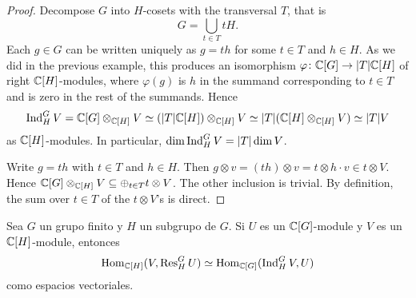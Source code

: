 \begin{proof}
Decompose $G$ into $H$-cosets with the transversal 
$T$, that is 
\[
G=\bigcup_{t\in T}tH.
\]
Each $g\in G$ can be written uniquely as $g=th$ for some $t\in T$ and $h\in H$. As we did in the previous example, this 
produces an isomorphism 
$\varphi\colon \mathbb{C}[G]\to |T|\mathbb{C}[H]$ of right $\mathbb{C}[H]$-modules, where $\varphi(g)$ is $h$ in the summand corresponding to $t\in T$
and is zero in the rest of the summands. Hence 
\[
\operatorname{Ind}_H^GV=\mathbb{C}[G]\otimes_{\mathbb{C}[H]}V\simeq (|T|\mathbb{C}[H])\otimes_{\mathbb{C}[H]}V\simeq |T|(\mathbb{C}[H]\otimes_{\mathbb{C}[H]}V)\simeq |T|V
\]
as $\mathbb{C}[H]$-modules. In particular, $\dim\operatorname{Ind}_H^GV=|T|\dim V$. 

 Write $g=th$ with $t\in T$ and $h\in H$. Then $g\otimes v=(th)\otimes v=t\otimes h\cdot v\in t\otimes V$. 
Hence $\mathbb{C}[G]\otimes_{\mathbb{C}[H]}V\subseteq \oplus_{t\in T}t\otimes V$. The other inclusion is trivial. By definition, 
the sum over $t\in T$ of the $t\otimes V$'s is direct.
\end{proof}

\begin{theorem}
Sea $G$ un grupo finito y $H$ un subgrupo de $G$. 
Si $U$ es un $\mathbb{C}[G]$-module y $V$ es un $\mathbb{C}[H]$-module, entonces
\[
\operatorname{Hom}_{\mathbb{C}[H]}(V,\operatorname{Res}_H^GU)\simeq \operatorname{Hom}_{\mathbb{C}[G]}(\operatorname{Ind}_H^GV,U)
\]
como espacios vectoriales.
\end{theorem}

